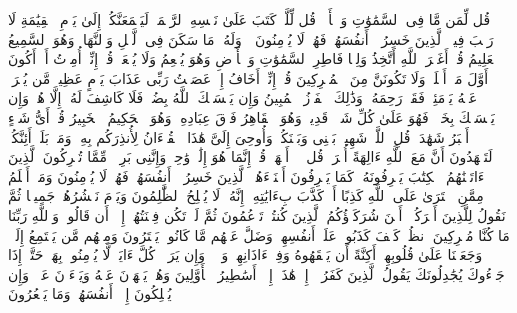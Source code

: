 \startbuffer[\q:6:12]
قُل لِّمَن مَّا فِی ٱلسَّمَٰوَٰتِ وَٱلۡأَرۡضِۖ قُل لِّلَّهِۚ كَتَبَ عَلَىٰ نَفۡسِهِ ٱلرَّحۡمَةَۚ لَیَجۡمَعَنَّكُمۡ إِلَىٰ یَوۡمِ ٱلۡقِیَٰمَةِ لَا رَیۡبَ فِیهِۚ ٱلَّذِینَ خَسِرُوۤا۟ أَنفُسَهُمۡ فَهُمۡ لَا یُؤۡمِنُونَ%
\stopbuffer
\startbuffer[\q:6:13]
۞ وَلَهُۥ مَا سَكَنَ فِی ٱلَّیۡلِ وَٱلنَّهَارِۚ وَهُوَ ٱلسَّمِیعُ ٱلۡعَلِیمُ%
\stopbuffer
\startbuffer[\q:6:14]
قُلۡ أَغَیۡرَ ٱللَّهِ أَتَّخِذُ وَلِیࣰّا فَاطِرِ ٱلسَّمَٰوَٰتِ وَٱلۡأَرۡضِ وَهُوَ یُطۡعِمُ وَلَا یُطۡعَمُۗ قُلۡ إِنِّیۤ أُمِرۡتُ أَنۡ أَكُونَ أَوَّلَ مَنۡ أَسۡلَمَۖ وَلَا تَكُونَنَّ مِنَ ٱلۡمُشۡرِكِینَ%
\stopbuffer
\startbuffer[\q:6:15]
قُلۡ إِنِّیۤ أَخَافُ إِنۡ عَصَیۡتُ رَبِّی عَذَابَ یَوۡمٍ عَظِیمࣲ%
\stopbuffer
\startbuffer[\q:6:16]
مَّن یُصۡرَفۡ عَنۡهُ یَوۡمَئِذࣲ فَقَدۡ رَحِمَهُۥۚ وَذَٰلِكَ ٱلۡفَوۡزُ ٱلۡمُبِینُ%
\stopbuffer
\startbuffer[\q:6:17]
وَإِن یَمۡسَسۡكَ ٱللَّهُ بِضُرࣲّ فَلَا كَاشِفَ لَهُۥۤ إِلَّا هُوَۖ وَإِن یَمۡسَسۡكَ بِخَیۡرࣲ فَهُوَ عَلَىٰ كُلِّ شَیۡءࣲ قَدِیرࣱ%
\stopbuffer
\startbuffer[\q:6:18]
وَهُوَ ٱلۡقَاهِرُ فَوۡقَ عِبَادِهِۦۚ وَهُوَ ٱلۡحَكِیمُ ٱلۡخَبِیرُ%
\stopbuffer
\startbuffer[\q:6:19]
قُلۡ أَیُّ شَیۡءٍ أَكۡبَرُ شَهَٰدَةࣰۖ قُلِ ٱللَّهُۖ شَهِیدُۢ بَیۡنِی وَبَیۡنَكُمۡۚ وَأُوحِیَ إِلَیَّ هَٰذَا ٱلۡقُرۡءَانُ لِأُنذِرَكُم بِهِۦ وَمَنۢ بَلَغَۚ أَئِنَّكُمۡ لَتَشۡهَدُونَ أَنَّ مَعَ ٱللَّهِ ءَالِهَةً أُخۡرَىٰۚ قُل لَّاۤ أَشۡهَدُۚ قُلۡ إِنَّمَا هُوَ إِلَٰهࣱ وَٰحِدࣱ وَإِنَّنِی بَرِیۤءࣱ مِّمَّا تُشۡرِكُونَ%
\stopbuffer
\startbuffer[\q:6:20]
ٱلَّذِینَ ءَاتَیۡنَٰهُمُ ٱلۡكِتَٰبَ یَعۡرِفُونَهُۥ كَمَا یَعۡرِفُونَ أَبۡنَاۤءَهُمُۘ ٱلَّذِینَ خَسِرُوۤا۟ أَنفُسَهُمۡ فَهُمۡ لَا یُؤۡمِنُونَ%
\stopbuffer
\startbuffer[\q:6:21]
وَمَنۡ أَظۡلَمُ مِمَّنِ ٱفۡتَرَىٰ عَلَى ٱللَّهِ كَذِبًا أَوۡ كَذَّبَ بِءَایَٰتِهِۦۤۚ إِنَّهُۥ لَا یُفۡلِحُ ٱلظَّٰلِمُونَ%
\stopbuffer
\startbuffer[\q:6:22]
وَیَوۡمَ نَحۡشُرُهُمۡ جَمِیعࣰا ثُمَّ نَقُولُ لِلَّذِینَ أَشۡرَكُوۤا۟ أَیۡنَ شُرَكَاۤؤُكُمُ ٱلَّذِینَ كُنتُمۡ تَزۡعُمُونَ%
\stopbuffer
\startbuffer[\q:6:23]
ثُمَّ لَمۡ تَكُن فِتۡنَتُهُمۡ إِلَّاۤ أَن قَالُوا۟ وَٱللَّهِ رَبِّنَا مَا كُنَّا مُشۡرِكِینَ%
\stopbuffer
\startbuffer[\q:6:24]
ٱنظُرۡ كَیۡفَ كَذَبُوا۟ عَلَىٰۤ أَنفُسِهِمۡۚ وَضَلَّ عَنۡهُم مَّا كَانُوا۟ یَفۡتَرُونَ%
\stopbuffer
\startbuffer[\q:6:25]
وَمِنۡهُم مَّن یَسۡتَمِعُ إِلَیۡكَۖ وَجَعَلۡنَا عَلَىٰ قُلُوبِهِمۡ أَكِنَّةً أَن یَفۡقَهُوهُ وَفِیۤ ءَاذَانِهِمۡ وَقۡرࣰاۚ وَإِن یَرَوۡا۟ كُلَّ ءَایَةࣲ لَّا یُؤۡمِنُوا۟ بِهَاۖ حَتَّىٰۤ إِذَا جَاۤءُوكَ یُجَٰدِلُونَكَ یَقُولُ ٱلَّذِینَ كَفَرُوۤا۟ إِنۡ هَٰذَاۤ إِلَّاۤ أَسَٰطِیرُ ٱلۡأَوَّلِینَ%
\stopbuffer
\startbuffer[\q:6:26]
وَهُمۡ یَنۡهَوۡنَ عَنۡهُ وَیَنۡءَوۡنَ عَنۡهُۖ وَإِن یُهۡلِكُونَ إِلَّاۤ أَنفُسَهُمۡ وَمَا یَشۡعُرُونَ%
